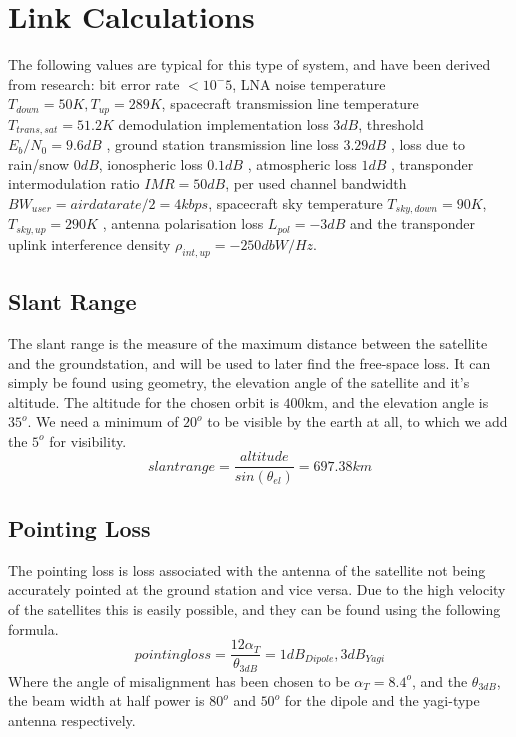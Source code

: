 \section{Link Calculations \label{app:LinkCalc}}
The following values are typical for this type of system, and have been derived from research: bit error rate $<10^-5$, LNA noise temperature $T_{down}=50K, T_{up}=289K$, spacecraft transmission line temperature $T_{trans, sat} = 51.2K$ demodulation implementation loss $3dB$, threshold $E_{b}/N_{0}=9.6dB$ \cite{SMAD}, ground station transmission line loss $3.29dB$ \cite{LineLossGS}, loss due to rain/snow $0dB$, ionospheric loss $0.1dB$ \cite{RainLoss}, atmospheric loss $1dB$ \cite{AtmosLoss}, transponder intermodulation ratio $IMR=50dB$, per used channel bandwidth $BW_{user}=air data rate/2=4kbps$, spacecraft sky temperature $T_{sky, down}=90K$, $T_{sky, up}=290K$ \cite{SMAD}, antenna polarisation loss $L_{pol}=-3dB$ and the transponder uplink interference density $\rho_{int, up}=-250dbW/Hz$.

\subsection{Slant Range}
The slant range is the measure of the maximum distance between the satellite and the groundstation, and will be used to later find the free-space loss.
It can simply be found using geometry, the elevation angle of the satellite and it's altitude. The altitude for the chosen orbit is $400$km, and the elevation angle is $35^o$. We need a minimum of $20^o$ to be visible by the earth at all, to which we add the $5^o$ for visibility.
\begin{equation}
slant range = \dfrac{altitude}{sin(\theta_{el})}=697.38km
\end{equation}

\subsection{Pointing Loss}
The pointing loss is loss associated with the antenna of the satellite not being accurately pointed at the ground station and vice versa. Due to the high velocity of the satellites this is easily possible, and they can be found using the following formula.
\begin{equation}
pointing loss = \frac{12\alpha_{T}}{\theta_{3dB}}=1dB_{Dipole}, 3dB_{Yagi}
\end{equation}
Where the angle of misalignment has been chosen to be $\alpha_{T}=8.4^o$, and the $\theta_{3dB}$, the beam width at half power is $80^o$ and $50^o$ \cite{BeamWidth} for the dipole and the yagi-type antenna respectively.

